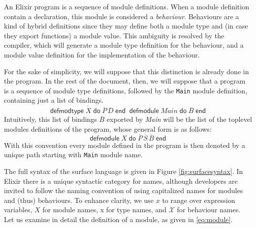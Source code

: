 \documentclass[a4paper,10pt]{article}
\author{Aghilas Y. Boussaa}
\DeclareMathOperator{\kwdefmt}{\textsf{defmodtype}}
\DeclareMathOperator{\kwend}{\textsf{end}}
\DeclareMathOperator{\kwdo}{\textsf{do}}
\DeclareMathOperator{\kwdefm}{\textsf{defmodule}}
\newcommand{\tx}{\textrm{x}}
\begin{document}
An Elixir program is a sequence of module definitions. When a module definition contain a  declaration, this module is considered a \emph{behaviour}. Behaviours are a kind of hybrid definitions since they may define both a module type and (in case they export functions) a module value. This ambiguity is resolved by the compiler, which will generate a module type definition for the behaviour, and a module value definition for the implementation of the behaviour.

For the sake of simplicity, we will suppose that this distinction is already done in the program. In the rest of the document, then, we will suppose that a program is a sequence of module type definitions, followed by the \texttt{Main} module definition, containing just a list of bindings. 
\[\overline{\kwdefmt X \kwdo \overline{P}\, \overline{D} \kwend}\kwdefm \textit{Main} \kwdo \overline{B} \kwend\]
Intuitively, this list of bindings $\overline{B}$ exported by \textit{Main} will be the list of the toplevel modules definitions of the program, whose general form is as follows: 
\begin{equation}\label{eq:module}
\kwdefm X \kwdo \overline{P}\, \overline{S}\, \overline{B} \kwend
\end{equation}
With this convention every module defined in the program is then denoted by a unique path starting with \texttt{Main} module name.

The full syntax of the surface language is given in Figure \ref{fig:surfacesyntax}. In Elixir there is a unique syntactic category for names, although developers are invited to follow the naming convention of using capitalized names for modules and (thus) behaviours. To enhance clarity, we use $x$ to range over expression variables, $X$ for module names, $\tx$ for type names, and $\mathcal X$ for behaviour names. Let us examine in detail the definition of a module, as given in \eqref{eq:module}.
\end{document}
